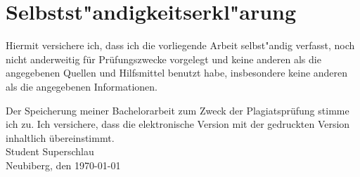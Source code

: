 \chapter*{Selbstst"andigkeitserkl"arung}

Hiermit versichere ich, dass ich die vorliegende Arbeit selbst"andig verfasst, noch nicht anderweitig für Prüfungszwecke vorgelegt und keine anderen als die angegebenen Quellen und Hilfsmittel benutzt habe, insbesondere keine anderen als die angegebenen Informationen.

Der Speicherung meiner Bachelorarbeit zum Zweck der Plagiatsprüfung stimme ich zu. Ich versichere, dass die elektronische Version mit der gedruckten Version inhaltlich übereinstimmt.\\[2cm]
\noindent
Student Superschlau\\
Neubiberg, den \today{} 


